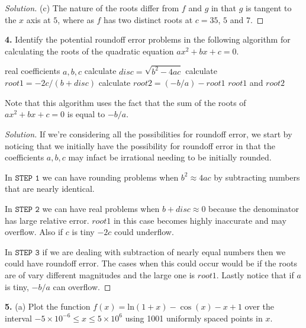 \documentclass[12pt]{amsart}
\newenvironment{solution}
{\begin{proof}[Solution]}
{\end{proof}}
\begin{document}
\begin{onehalfspace}
\begin{solution}
            (c) The nature of the roots differ from $f$ and $g$ in that $g$ is tangent to the $x$ axis at $5$, where
            as $f$ has two distinct roots at $c = 35$, $5$ and $7$.
        \end{solution}

        \textbf{4.} Identify the potential roundoff error problems in the following algorithm for calculating
        the roots of the quadratic equation $ax^2 + bx + c = 0$.
        \begin{itemize}[label={}]
            \centering
             real coefficients $a, b, c$
             calculate $disc = \sqrt{b^2 - 4ac}$
             calculate $root1 = -2c/(b + disc)$
             calculate $root2 = (-b/a) - root1$
             $root1$ and $root2$
        \end{itemize}
        Note that this algorithm uses the fact that the sum of the roots of $ax^2 + bx + c = 0$ is equal to $-b/a$.
        \begin{solution}
            If we're considering all the possibilities for roundoff error, we start by noticing that we initially
            have the possibility for roundoff error in that the coefficients $a, b, c$ may infact be irrational needing
            to be initially rounded.

            In $\texttt{STEP 1}$ we can have rounding problems when $b^2\approx 4ac$ by subtracting numbers
            that are nearly identical.

            In $\texttt{STEP 2}$ we can have real problems when $b+ disc\approx 0$ because the denominator has
            large relative error.
            $root1$ in this case becomes highly inaccurate and may overflow. Also if $c$ is tiny $-2c$ could underflow.

            In $\texttt{STEP 3}$ if we are dealing with subtraction of nearly equal numbers then we could have
            roundoff error. The cases when this could occur would be if the roots are of vary different magnitudes
            and the large one is $root1$.
            Lastly notice that if $a$ is tiny, $-b/a$ can overflow.
        \end{solution}

        \textbf{5.} (a) Plot the function $f(x) = \text{ln}(1+ x) - \cos(x) - x + 1$ over the interval
        $-5\times 10^{-6}\le x\le 5\times10^{6}$ using 1001 uniformly spaced points in $x$.


\end{onehalfspace}
\end{document}
